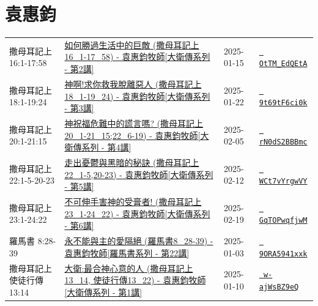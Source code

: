 \documentclass{book}
\begin{document}
\chapter{袁惠鈞}\label{ch:preacher6}
\begin{multicols}{3}
\minitoc
\end{multicols}
{ \scriptsize


\begin{xltabular}{\textwidth}{|p{0.15\textwidth} p{0.6\textwidth}|p{0.07\textwidth} p{0.1\textwidth}|}
\hline
撒母耳記上 16:1-17:58 & \hyperref[sec:OtTM_EdQEtA]{如何勝過生活中的巨敵 (撒母耳記上16\_1-17\_58) - 袁惠鈞牧師[大衛傳系列 - 第2講]} & 2025-01-15 & \href{https://youtube.com/watch?v=OtTM_EdQEtA}{\texttt{ OtTM\_EdQEtA}} \\
撒母耳記上 18:1-19:24 & \hyperref[sec:9t69tF6ci0k]{神啊!求你救我脫離惡人 (撒母耳記上18\_1-19\_24) - 袁惠鈞牧師[大衛傳系列 - 第3講]} & 2025-01-22 & \href{https://youtube.com/watch?v=9t69tF6ci0k}{\texttt{ 9t69tF6ci0k}} \\
撒母耳記上 20:1-21:15 & \hyperref[sec:rN0dS2BBBmc]{神祝福危難中的謊言嗎?  (撒母耳記上20\_1-21\_15;22\_6-19) - 袁惠鈞牧師[大衛傳系列 - 第4講]} & 2025-02-05 & \href{https://youtube.com/watch?v=rN0dS2BBBmc}{\texttt{ rN0dS2BBBmc}} \\
撒母耳記上 22:1-5-20-23 & \hyperref[sec:WCt7vYrgwVY]{走出憂鬱與黑暗的秘訣 (撒母耳記上22\_1-5,20-23) - 袁惠鈞牧師[大衛傳系列 - 第5講]} & 2025-02-12 & \href{https://youtube.com/watch?v=WCt7vYrgwVY}{\texttt{ WCt7vYrgwVY}} \\
撒母耳記上 23:1-24:22 & \hyperref[sec:GqTOPwqfjwM]{不可伸手害神的受膏者! (撒母耳記上23\_1-24\_22) - 袁惠鈞牧師[大衛傳系列 - 第6講]} & 2025-02-19 & \href{https://youtube.com/watch?v=GqTOPwqfjwM}{\texttt{ GqTOPwqfjwM}} \\
羅馬書 8:28-39 & \hyperref[sec:9ORA5941xxk]{永不能與主的愛隔絕 (羅馬書8\_28-39) - 袁惠鈞牧師[羅馬書系列 - 第22講]} & 2025-01-03 & \href{https://youtube.com/watch?v=9ORA5941xxk}{\texttt{ 9ORA5941xxk}} \\
撒母耳記上使徒行傳 13:14 & \hyperref[sec:w_ajWsBZ9eQ]{大衛:最合神心意的人 (撒母耳記上13\_14, 使徒行傳13\_22) - 袁惠鈞牧師[大衛傳系列 - 第1講]} & 2025-01-10 & \href{https://youtube.com/watch?v=w-ajWsBZ9eQ}{\texttt{ w-ajWsBZ9eQ}} \\
\hline
\end{xltabular}
}
\newpage
\end{document}
